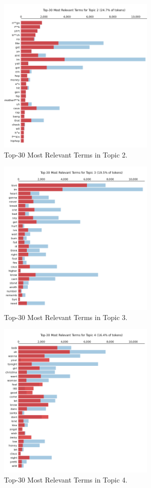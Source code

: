 \begin{center}
\begin{figure}[H]
  \centering
  \includegraphics[width=3in]{img/topics/png/t2_censored.png}
  \caption{Top-30 Most Relevant Terms in Topic 2.}
  \label{Figure:fig_eh}
\end{figure}
\end{center}

\begin{center}
\begin{figure}[H]
  \centering
  \includegraphics[width=3in]{img/topics/png/t3.png}
  \caption{Top-30 Most Relevant Terms in Topic 3.}
  \label{Figure:t3}
\end{figure}
\end{center}

\begin{center}
\begin{figure}[H]
  \centering
  \includegraphics[width=3in]{img/topics/png/t4.png}
  \caption{Top-30 Most Relevant Terms in Topic 4.}
  \label{Figure:fig_eh}
\end{figure}
\end{center}

